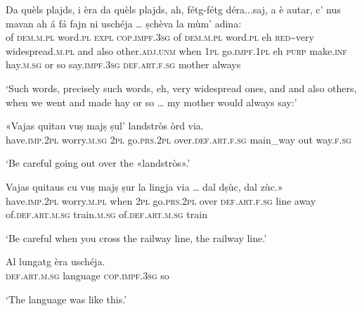 \begin{linenumbers}
\gll    Da quèls plajds\footnotemark, i èra da quèls plajds, ah, fétg-fétg déra...saj, a è autar, c' nus mavan ah á fá fajn ni uschéja … ṣchèva la mùm’ adina:\\
of \textsc{dem.m.pl} word.\textsc{pl} \textsc{expl} \textsc{cop.impf.3sg} of \textsc{dem.m.pl} word.\textsc{pl} eh \textsc{red}\textasciitilde{very} widespread.\textsc{m.pl} and also other.\textsc{adj.unm} when \textsc{1pl} go.\textsc{impf.1pl} eh \textsc{purp} make.\textsc{inf} hay.\textsc{m.sg} or so {} say.\textsc{impf.3sg} \textsc{def.art.f.sg} mother always\\
\end{linenumbers}
\medskip
\glt `Such words, precisely such words, eh, very widespread ones, and and also others, when we went and made hay or so … my mother would always say:'
\medskip

\begin{linenumbers}
\gll   «Vajas quitau vuṣ majṣ ṣul' landstròs òrd via. \\
have.\textsc{imp.2pl} worry.\textsc{m.sg} \textsc{2pl} go.\textsc{prs.2pl}  over.\textsc{def.art.f.sg} main\_way out way.\textsc{f.sg} \\
\end{linenumbers}
\medskip
\glt `Be careful going out over the «landstròs».'
\medskip

\begin{linenumbers}
\gll    Vajas quitaus cu vuṣ majṣ ṣur la lingja via …\footnotemark{} dal dṣùc, dal zùc\footnotemark.»\\
have.\textsc{imp.2pl} worry.\textsc{m.pl} when \textsc{2pl} go.\textsc{prs.2pl} over \textsc{def.art.f.sg} line away {} of.\textsc{def.art.m.sg} train.\textsc{m.sg} of.\textsc{def.art.m.sg} train\\
\end{linenumbers}
\medskip
\glt `Be careful when you cross the railway line, the railway line.' 
\medskip

\begin{linenumbers}
\gll    Al lungatg èra uschéja.\\
 \textsc{def.art.m.sg} language \textsc{cop.impf.3sg} so\\
\end{linenumbers}
\medskip
\glt `The language was like this.'
\medskip

